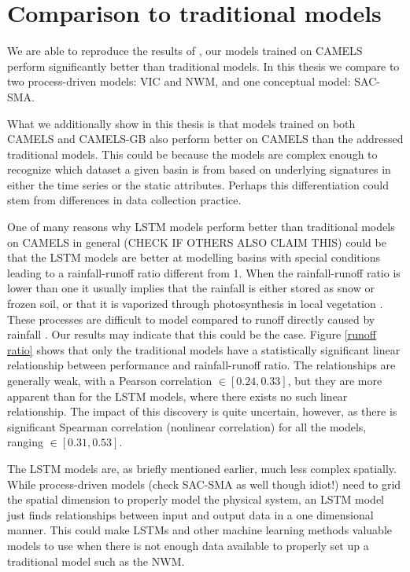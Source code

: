 \section{Comparison to traditional models}
We are able to reproduce the results of \citet{lstm_second_paper,lstm_third_paper}, our models 
trained on CAMELS perform significantly better than traditional models. In this 
thesis we compare to two process-driven models: VIC and NWM, and one conceptual 
model: SAC-SMA. 

What we additionally show in this thesis is that models trained on both CAMELS and CAMELS-GB 
also perform better on CAMELS than the addressed traditional models. This could 
be because the models are complex enough to recognize which dataset a given 
basin is from based on underlying signatures in either the time series or the 
static attributes. Perhaps this differentiation could stem from differences in 
data collection practice. 

One of many reasons why LSTM models perform better than traditional models on CAMELS in general
(CHECK IF OTHERS ALSO CLAIM THIS) \citationneeded could be that the LSTM 
models are better at modelling basins with special conditions leading to 
a rainfall-runoff ratio different from 1. When the rainfall-runoff ratio is lower 
than one it usually implies that the rainfall is either stored as snow or frozen 
soil, or that it is vaporized through photosynthesis in local vegetation \citationneeded. 
These processes are difficult to model compared to runoff directly caused by 
rainfall \citationneeded.
Our results may indicate that this could be the case.
Figure \ref{runoff ratio} shows that only the traditional models have 
a statistically significant linear relationship between performance and 
rainfall-runoff ratio. The relationships are generally weak, with a Pearson 
correlation $\in \left[ 0.24, 0.33 \right]$, but they are more apparent than 
for the LSTM models, where there exists no such linear relationship. The impact 
of this discovery is quite uncertain, however, as there is significant 
Spearman correlation (nonlinear correlation) for all the models, ranging 
$\in \left[ 0.31, 0.53 \right]$.

The LSTM models are, as briefly mentioned earlier, much less complex spatially. 
While process-driven models (check SAC-SMA as well though idiot!) need to grid the 
spatial dimension to properly model the physical system, an LSTM model just finds 
relationships between input and output data in a one dimensional manner. This could 
make LSTMs and other machine learning methods valuable models to use when there is not 
enough data available to properly set up a traditional model such as the NWM.

